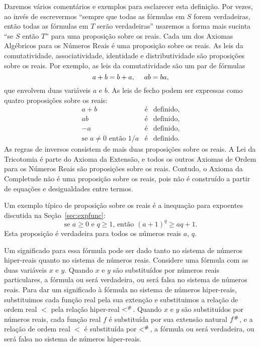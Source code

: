 Daremos vários comentários e exemplos para esclarecer esta definição. Por
vezes, ao invés de escrevermos ``sempre que todas as
fórmulas em $S$ forem verdadeiras, então todas as fórmulas em $T$ serão
verdadeiras'' usaremos a forma mais sucinta ``se $S$ então $T$'' para
uma proposição sobre os reais. Cada um dos Axiomas Algébricos para os Números
Reais é uma proposição sobre os reais. As leis da comutatividade,
associatividade, identidade e distributividade são proposições sobre os
reais. Por exemplo, as leis da comutatividade são um par de fórmulas
\[
a  + b = b + a, \hspace{3ex} ab = ba,
\]
que envolvem duas variáveis $a$ e $b$. As leis de fecho podem ser expressas
como quatro proposições sobre os reais:
\begin{eqnarray*}
a + b & \text{é} & \text{definido}, \\
ab    & \text{é} & \text{definido}, \\
-a    & \text{é} & \text{definido}, \\
\text{se } a \ne 0 \text{ então } 1/a & \text{é} & \text{definido}.
\end{eqnarray*}
As regras de inversos consistem de mais duas proposições sobre os reais. A
Lei da Tricotomia é parte do Axioma da Extensão, e todos os outros
Axiomas de Ordem para os Números Reais são proposições sobre os reais.
Contudo, o Axioma da Completude não é uma proposição sobre os reais,
pois não é construído a partir de equações e desigualdades entre
termos.

Um exemplo típico de proposição sobre os reais é a inequação para expoentes
discutida na Seção~\ref{sec:expfunc}:
$$
  \text{se } a \ge 0 \text{ e } q \ge 1\text{, então } (a+1)^q \ge aq + 1.
$$
Esta proposição é verdadeira para todos os números reais $a$, $q$.

Um significado para essa fórmula pode ser dado tanto no sistema de números
hiper-reais quanto no sistema de números reais. Considere uma fórmula com
as duas variáveis $x$ e $y$. Quando $x$ e $y$ são substituídos por números
reais particulares, a fórmula ou será verdadeira, ou será falsa no sistema de
números reais. Para dar um significado à fórmula no sistema de números
hiper-reais, substituimos cada função real pela sua extenção e substituimos
a relação de ordem real $<$ pela relação hiper-real ${<}^\#$. Quando
$x$ e $y$ são substituídos por números reais, cada função real $f$ é
substituída por sua extensão natural ${f}^\#$, e a relação de ordem
real $<$ é substituída por ${<}^\#$, a fórmula ou será verdadeira, ou
será falsa no sistema de números hiper-reais.

